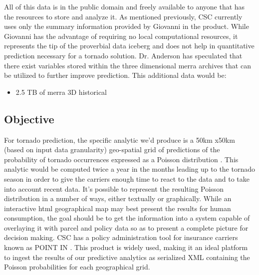 All of this data is in the public domain and freely available to anyone that has the resources to store and analyze it. As mentioned previously,  CSC currently uses only the summary information provided by Giovanni in the \climatedge product. While Giovanni has the advantage of requiring no local computational resources, it represents the tip of the proverbial data iceberg and does not help in quantitative prediction necessary for a tornado solution. Dr. Anderson has speculated that there exist variables stored within the three dimensional \gls{merra} archives that can be utilized to further improve prediction. This additional data would be:
\begin{itemize}
    \item 2.5 TB of \gls{merra} 3D historical \cite{mdisc}
\end{itemize}
\subsection{Objective}
For tornado prediction, the specific analytic we'd produce is a 50km x50km (based on input data granularity) geo-spatial grid of predictions of the probability of tornado occurrences expressed as a Poisson distribution \cite{anderson}. This analytic would be computed twice a year in the months leading up to the tornado season in order to give the carriers enough time to react to the data and to take into account recent data. It's possible to represent the resulting Poisson distribution in a number of ways, either textually or graphically. While an interactive \gls{html} geographical map may best present the results for human consumption, the goal should be to get the information into a system capable of overlaying it with parcel and policy data so as to present a complete picture for decision making. CSC has a policy administration tool for insurance carriers known as POINT IN \cite{point_in}. This product is widely used, making it an ideal platform to ingest the results of our predictive analytics as serialized XML containing the Poisson probabilities for each geographical grid.\\

